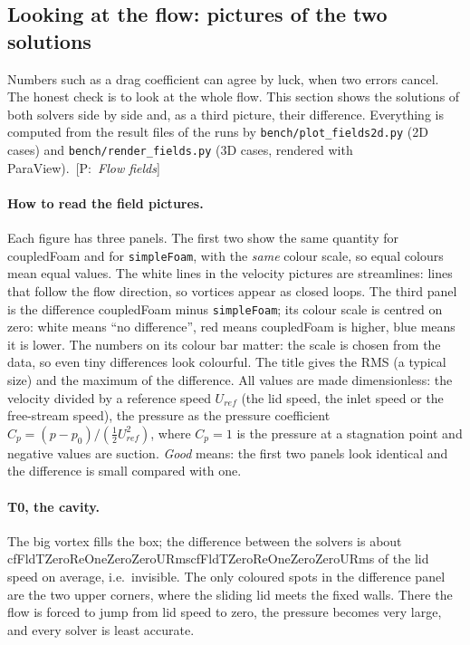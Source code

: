 \documentclass[11pt,a4paper]{article}
\newcommand{\cfpendingmark}{\fbox{\scriptsize pending}}
\newcommand{\cfnum}[1]{%
  \ifcsname cf#1\endcsname\csname cf#1\endcsname\else\cfpendingmark\fi}
\newcommand{\code}[1]{\texttt{#1}}
\newcommand{\pro}[1]{\ {\small[P:~\textit{#1}]}}
\begin{document}
\clearpage
\subsection{Looking at the flow: pictures of the two solutions}\label{sec:flowpics}

Numbers such as a drag coefficient can agree by luck, when two errors
cancel. The honest check is to look at the whole flow. This section shows
the solutions of both solvers side by side and, as a third picture, their
difference. Everything is computed from the result files of the runs by
\code{bench/plot\_fields2d.py} (2D cases) and \code{bench/render\_fields.py}
(3D cases, rendered with ParaView).\pro{Flow fields}

\paragraph{How to read the field pictures.} Each figure has three panels.
The first two show the same quantity for coupledFoam and for
\code{simpleFoam}, with the \emph{same} colour scale, so equal colours mean
equal values. The white lines in the velocity pictures are streamlines:
lines that follow the flow direction, so vortices appear as closed loops.
The third panel is the difference coupledFoam minus \code{simpleFoam}; its
colour scale is centred on zero: white means ``no difference'', red means
coupledFoam is higher, blue means it is lower. The numbers on its
colour bar matter: the scale is chosen from the data, so even tiny differences
look colourful. The title gives the RMS (a typical size) and the maximum of
the difference. All values are made dimensionless: the velocity divided by
a reference speed $U_{ref}$ (the lid speed, the inlet speed or the
free-stream speed), the pressure as the pressure coefficient
$C_p=(p-p_0)/(\tfrac12U_{ref}^2)$, where $C_p=1$ is the pressure at a
stagnation point and negative values are suction. \emph{Good} means: the
first two panels look identical and the difference is small compared with
one.

\paragraph{T0, the cavity.} The big vortex fills the box; the difference
between the solvers is about \cfnum{FldTZeroReOneZeroZeroURms} of the lid
speed on average, i.e.\ invisible. The only coloured spots in the difference
panel are the two upper corners, where the sliding lid meets the fixed
walls. There the flow is forced to jump from lid speed to zero, the pressure
becomes very large, and every solver is least accurate.
\end{document}
